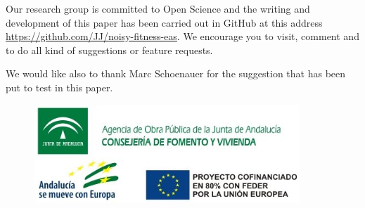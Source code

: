 \documentclass{llncs}
\begin{document}
Our research group is committed to Open Science and the writing and
development of this paper has been carried out in GitHub at this
address \url{https://github.com/JJ/noisy-fitness-eas}. We encourage you
to visit, comment and to do all kind of suggestions or feature
requests.

We would like also to thank Marc Schoenauer for the suggestion that
has been put to test in this paper.


\begin{figure}[!h]
\begin{center}
\includegraphics[width=10cm]{../images/logos_SIPESCA_2.jpg}
\end{center}
\end{figure}


  
\end{document}
